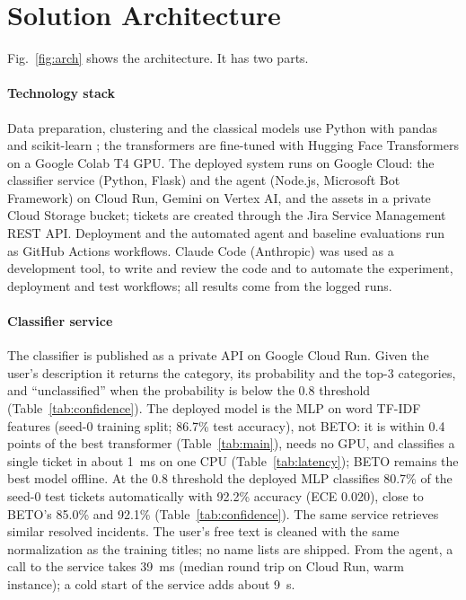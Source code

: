 \documentclass[conference]{IEEEtran}
\begin{document}
\section{Solution Architecture}\label{sec:architecture}

Fig.~\ref{fig:arch} shows the architecture. It has two parts.

\paragraph{Technology stack} Data preparation, clustering and the classical models use Python with pandas
and scikit-learn \cite{pedregosa2011}; the transformers are fine-tuned with Hugging Face Transformers on a Google
Colab T4 GPU. The deployed system runs on Google Cloud: the classifier service (Python, Flask) and the agent
(Node.js, Microsoft Bot Framework) on Cloud Run, Gemini on Vertex AI, and the assets in a private Cloud Storage
bucket; tickets are created through the Jira Service Management REST API. Deployment and the automated agent and
baseline evaluations run as GitHub Actions workflows. Claude Code (Anthropic) was used as a development tool, to
write and review the code and to automate the experiment, deployment and test workflows; all results come from
the logged runs.

\paragraph{Classifier service} The classifier is published as a private API on Google Cloud Run. Given the
user's description it returns the category, its probability and the top-3 categories, and ``unclassified'' when
the probability is below the 0.8 threshold (Table~\ref{tab:confidence}). The deployed model is the MLP on word
TF-IDF features (seed-0 training split; 86.7\% test accuracy), not BETO: it is within 0.4 points of the best
transformer (Table~\ref{tab:main}), needs no GPU, and classifies a single ticket in about 1~ms on one CPU
(Table~\ref{tab:latency}); BETO remains the best model offline. At the 0.8 threshold the deployed MLP
classifies 80.7\% of the seed-0 test tickets automatically with 92.2\% accuracy (ECE 0.020), close to BETO's
85.0\% and 92.1\% (Table~\ref{tab:confidence}). The same service retrieves similar resolved incidents. The
user's free text is cleaned with the same normalization as the training titles; no name lists are shipped.
From the agent, a call to the service takes 39~ms (median round trip on Cloud Run, warm instance); a cold start
of the service adds about 9~s.
\end{document}
